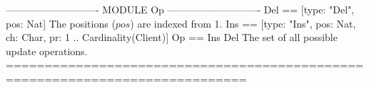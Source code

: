 \documentclass[preview, border={5pt 0pt 5pt 1pt}]{standalone}
\begin{document}
\begin{tla}
---------------------------- MODULE Op ----------------------------
Del == [type: {"Del"}, pos: Nat] \* The positions ($pos$) are indexed from 1.
Ins == [type: {"Ins"}, pos: Nat, ch: Char, pr: 1 .. Cardinality(Client)]
Op == Ins \cup Del \* The set of all possible update operations.
=============================================================================
\end{tla}
\begin{tlatex}
\@x{}\moduleLeftDash{}\moduleRightDash\@xx{}%
%
%
\@xx{}%
%
%
\@xx{}%
\@x{}\bottombar\@xx{}%
\end{tlatex}
\end{document}
